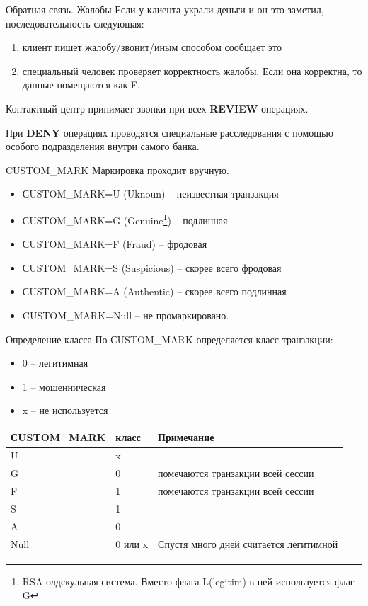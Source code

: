 \begin{frame}{Обратная связь. Жалобы}
	Если у клиента украли деньги и он это заметил, последовательность следующая:
	\begin{enumerate}
		\item клиент пишет жалобу/звонит/иным способом сообщает это
		\item специальный человек проверяет корректность жалобы. 
		Если она корректна, то данные помещаются как F.
	\end{enumerate}
	
	Контактный центр принимает звонки при всех \textbf{REVIEW} операциях.
	
	При \textbf{DENY} операциях проводятся специальные расследования с помощью 
	особого подразделения внутри самого банка.
\end{frame}

\begin{frame}{CUSTOM\_MARK}\label{frame:custom_mark}
	Маркировка проходит вручную.
	\begin{itemize}
		\item СUSTOM\_MARK=U (Uknoun) – неизвестная транзакция
		\item СUSTOM\_MARK=G (Genuine\footnote{RSA олдскульная система. Вместо флага L(legitim) в ней используется флаг G}) – подлинная
		\item СUSTOM\_MARK=F (Fraud) – фродовая
		\item СUSTOM\_MARK=S (Suspicious) – скорее всего фродовая
		\item СUSTOM\_MARK=A (Authentic) – скорее всего подлинная
		\item CUSTOM\_MARK=Null – не промаркировано.
	\end{itemize}
\end{frame}


\begin{frame}{Определение класса}
	По  СUSTOM\_MARK определяется класс транзакции:
	\begin{itemize}
		\item 0 -- легитимная
		\item 1 -- мошенническая
		\item x -- не используется
	\end{itemize}
	
	\begin{tabular}{|l|l|l|}
		\hline
		СUSTOM\_MARK & класс & Примечание \\ \hline
		U & x & \\ \hline
		G & 0 & \small помечаются транзакции всей сессии\\ \hline
		F & 1 & \small помечаются транзакции всей сессии\\ \hline
		S & 1 & \\ \hline
		A & 0 & \\ \hline
		Null & 0 или x & \footnotesize Спустя много дней считается легитимной\\ \hline
	\end{tabular}
\end{frame}

